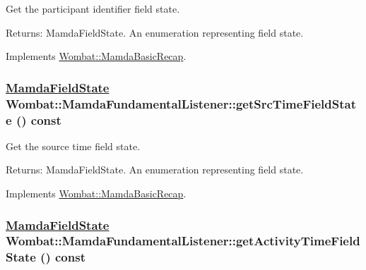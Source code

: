 Get the participant identifier field state. 

\begin{Desc}
\item[Returns:]Mamda\-Field\-State. An enumeration representing field state. \end{Desc}


Implements \hyperlink{classWombat_1_1MamdaBasicRecap_97e4612d57ce6387e6414b00b201e242}{Wombat::Mamda\-Basic\-Recap}.\hypertarget{classWombat_1_1MamdaFundamentalListener_b375ecf594f9fd285f046d698da763af}{
\subsubsection[getSrcTimeFieldState]{\setlength{\rightskip}{0pt plus 5cm}\hyperlink{namespaceWombat_93aac974f2ab713554fd12a1fa3b7d2a}{Mamda\-Field\-State} Wombat::Mamda\-Fundamental\-Listener::get\-Src\-Time\-Field\-State () const}}
\label{classWombat_1_1MamdaFundamentalListener_b375ecf594f9fd285f046d698da763af}


Get the source time field state. 

\begin{Desc}
\item[Returns:]Mamda\-Field\-State. An enumeration representing field state. \end{Desc}


Implements \hyperlink{classWombat_1_1MamdaBasicRecap_ee5ca73a67ccc8d81b78cf02fa36ec37}{Wombat::Mamda\-Basic\-Recap}.\hypertarget{classWombat_1_1MamdaFundamentalListener_d6594a4cff5a7bf08b8f4fcc171d68d9}{
\subsubsection[getActivityTimeFieldState]{\setlength{\rightskip}{0pt plus 5cm}\hyperlink{namespaceWombat_93aac974f2ab713554fd12a1fa3b7d2a}{Mamda\-Field\-State} Wombat::Mamda\-Fundamental\-Listener::get\-Activity\-Time\-Field\-State () const}}
\label{classWombat_1_1MamdaFundamentalListener_d6594a4cff5a7bf08b8f4fcc171d68d9}


